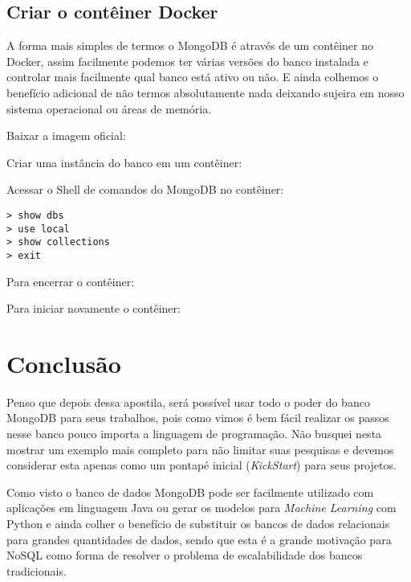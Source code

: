 \documentclass[a4paper,11pt]{article}
\begin{document}
\subsection{Criar o contêiner Docker}
A forma mais simples de termos o MongoDB é através de um contêiner no Docker, assim facilmente podemos ter várias versões do banco instalada e controlar mais facilmente qual banco está ativo ou não. E ainda colhemos o benefício adicional de não termos absolutamente nada deixando sujeira em nosso sistema operacional ou áreas de memória.

Baixar a imagem oficial: \\

Criar uma instância do banco em um contêiner: \\

Acessar o Shell de comandos do MongoDB no contêiner: \\
\begin{lstlisting}[]
> show dbs
> use local
> show collections
> exit
\end{lstlisting}

Para encerrar o contêiner: \\

Para iniciar novamente o contêiner: \\





\section{Conclusão}
Penso que depois dessa apostila, será possível usar todo o poder do banco MongoDB para seus trabalhos, pois como vimos é bem fácil realizar os passos nesse banco pouco importa a linguagem de programação. Não busquei nesta mostrar um exemplo mais completo para não limitar suas pesquisas e devemos considerar esta apenas como um pontapé inicial (\textit{KickStart}) para seus projetos.

Como visto o banco de dados MongoDB pode ser facilmente utilizado com aplicações em linguagem Java ou gerar os modelos para \textit{Machine Learning} com Python e ainda colher o benefício de substituir os bancos de dados relacionais para grandes quantidades de dados, sendo que esta é a grande motivação para NoSQL como forma de resolver o problema de escalabilidade dos bancos tradicionais.
\end{document}
